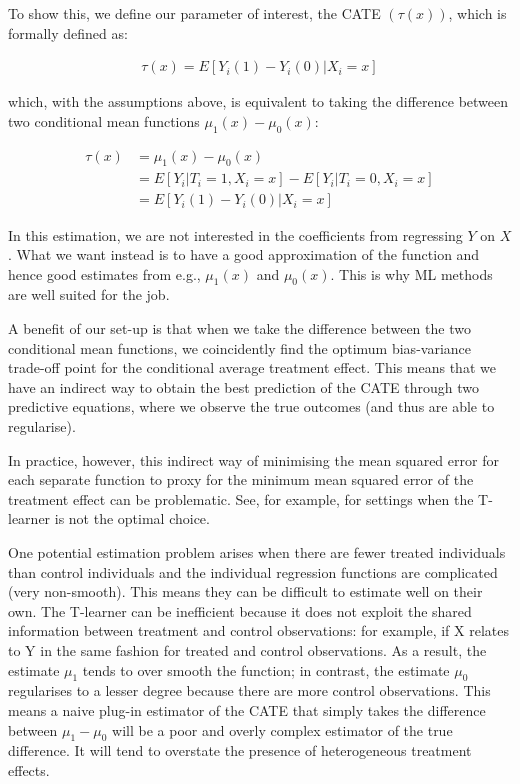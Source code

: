 \documentclass[12pt, a4paper]{article}
\begin{document}
To show this, we define our parameter of interest, the CATE $(\tau (x))$, which is formally defined as:

\begin{align}
\tau (x) = E[Y_i(1) - Y_i(0) | X_i = x]
\end{align}

which, with the assumptions above, is equivalent to taking the difference between two conditional mean functions $\mu _1(x) - \mu _0(x)$:

\begin{align}
\tau (x) & = \mu _1(x) - \mu _0(x) \\
& = E[Y_i | T_i = 1, X_i = x] - E[Y_i | T_i = 0, X_i = x] \\
& = E[Y_i(1) - Y_i(0) | X_i = x]
\end{align}

In this estimation, we are not interested in the coefficients from regressing $Y$ on $X$. What we want instead is to have a good approximation of the function and hence good estimates from e.g., $\mu _1(x)$ and $\mu _0(x)$. This is why ML methods are well suited for the job.

A benefit of our set-up is that when we take the difference between the two conditional mean functions, we coincidently find the optimum bias-variance trade-off point for the conditional average treatment effect. This means that we have an indirect way to obtain the best prediction of the CATE through two predictive equations, where we observe the true outcomes (and thus are able to regularise).

In practice, however, this indirect way of minimising the mean squared error for each separate function to proxy for the minimum mean squared error of the treatment effect can be problematic. See, for example, \cite{kunzel2019,kennedy2020} for settings when the T-learner is not the optimal choice.

One potential estimation problem arises when there are fewer treated individuals than control individuals and the individual regression functions are complicated (very non-smooth). This means they can be difficult to estimate well on their own. The T-learner can be inefficient because it does not exploit the shared information between treatment and control observations: for example, if X relates to Y in the same fashion for treated and control observations. As a result, the estimate $\mu _1$ tends to over smooth the function; in contrast, the estimate $\mu _0$ regularises to a lesser degree because there are more control observations. This means a naive plug-in estimator of the CATE that simply takes the difference between $\mu _1 - \mu _0$ will be a poor and overly complex estimator of the true difference. It will tend to overstate the presence of heterogeneous treatment effects.
\end{document}
